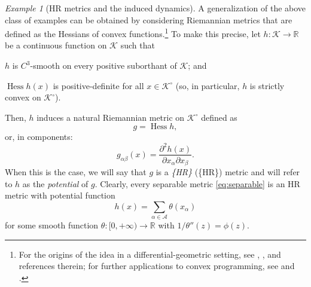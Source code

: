 \documentclass[reqno]{amsart}
\theoremstyle{plain}
\theoremstyle{definition}
\theoremstyle{remark}
\newtheorem{example}[theorem]{Example}
\numberwithin{equation}{section}
\numberwithin{theorem}{section}
\begin{document}
\begin{example}
[\acl{HR} metrics and the induced dynamics]
\label{ex:HR}
A generalization of the above class of examples can be obtained by considering Riemannian metrics that are defined as the Hessians of convex functions.\footnote{For the origins of the idea in a differential-geometric setting, see \cite{Shi77}, \cite{Dui01}, and references therein;
for further applications to convex programming, see \cite{BT03} and \cite{ABB04}.}
To make this precise, let $h{\colon}{\mathcal{K}}\to{\mathbb{R}}$ be a continuous function on ${\mathcal{K}}$ such that
\begin{inparaenum}
\item
$h$ is $C^{3}$-smooth on every positive suborthant of ${\mathcal{K}}$;
and
\item
$\operatorname{Hess} h(x)$ is positive-definite for all $x\in{{\mathcal{K}}^{\circ}}$ (so, in particular, $h$ is strictly convex on ${{\mathcal{K}}^{\circ}}$).
\end{inparaenum}
Then, $h$ induces a natural Riemannian metric on ${{\mathcal{K}}^{\circ}}$ defined as
\begin{equation}
\label{eq:HR}
g = \operatorname{Hess} h ,
\end{equation}
or, in components:
\begin{equation}
g_{\alpha\beta}(x)
	= \frac{{\partial}^{2} h(x)}{{\partial} x_{\alpha} {\partial} x_{\beta}}.
\end{equation}
When this is the case, we will say that $g$ is a {\emph{\acl{{HR}}} \textup(\acs{{HR}}\textup)} metric and will refer to $h$ as the \emph{potential} of $g$.
Clearly, every separable metric \eqref{eq:separable} is an \ac{HR} metric with potential function
\begin{equation}
\label{eq:decomposable}
h(x)
	= \sum_{\alpha\in{\mathcal{A}}} \theta(x_{\alpha})
\end{equation}
for some smooth function $\theta{\colon}[0,+\infty)\to{\mathbb{R}}$ with $1/\theta''(z) = {\phi}(z)$.


\end{example}
\end{document}
